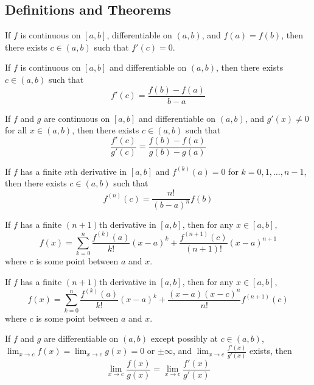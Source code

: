 \subsection*{Definitions and Theorems}

\begin{theorem}
If $f$ is continuous on $[a,b]$, differentiable on $(a,b)$, and $f(a) = f(b)$, then there exists $c \in (a,b)$ such that $f'(c) = 0$.
\end{theorem}

\begin{theorem}
If $f$ is continuous on $[a,b]$ and differentiable on $(a,b)$, then there exists $c \in (a,b)$ such that
\[ f'(c) = \frac{f(b) - f(a)}{b - a} \]
\end{theorem}

\begin{theorem}
If $f$ and $g$ are continuous on $[a,b]$ and differentiable on $(a,b)$, and $g'(x) \neq 0$ for all $x \in (a,b)$, then there exists $c \in (a,b)$ such that
\[ \frac{f'(c)}{g'(c)} = \frac{f(b) - f(a)}{g(b) - g(a)} \]
\end{theorem}

\begin{theorem}
If $f$ has a finite $n$th derivative in $[a,b]$ and $f^{(k)}(a) = 0$ for $k = 0, 1, \ldots, n-1$, then there exists $c \in (a,b)$ such that
\[ f^{(n)}(c) = \frac{n!}{(b-a)^n} f(b) \]
\end{theorem}

\begin{theorem}
If $f$ has a finite $(n+1)$th derivative in $[a,b]$, then for any $x \in [a,b]$,
\[ f(x) = \sum_{k=0}^{n} \frac{f^{(k)}(a)}{k!} (x-a)^k + \frac{f^{(n+1)}(c)}{(n+1)!} (x-a)^{n+1} \]
where $c$ is some point between $a$ and $x$.
\end{theorem}

\begin{theorem}
If $f$ has a finite $(n+1)$th derivative in $[a,b]$, then for any $x \in [a,b]$,
\[ f(x) = \sum_{k=0}^{n} \frac{f^{(k)}(a)}{k!} (x-a)^k + \frac{(x-a)(x-c)^n}{n!} f^{(n+1)}(c) \]
where $c$ is some point between $a$ and $x$.
\end{theorem}

\begin{theorem}
If $f$ and $g$ are differentiable on $(a,b)$ except possibly at $c \in (a,b)$, $\lim_{x \to c} f(x) = \lim_{x \to c} g(x) = 0$ or $\pm\infty$, and $\lim_{x \to c} \frac{f'(x)}{g'(x)}$ exists, then
\[ \lim_{x \to c} \frac{f(x)}{g(x)} = \lim_{x \to c} \frac{f'(x)}{g'(x)} \]
\end{theorem}

